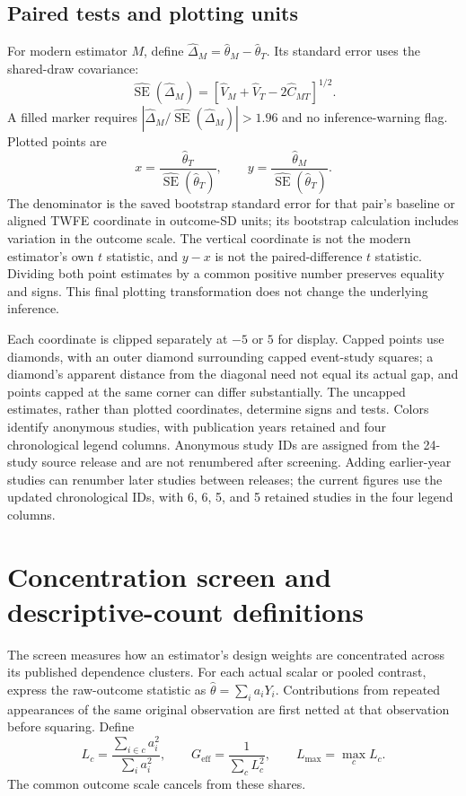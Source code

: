 \documentclass[11pt,letterpaper]{article}
\newcommand{\SE}{\operatorname{SE}}
\begin{document}
\subsection{Paired tests and plotting units}
For modern estimator $M$, define $\hat\Delta_M=\hat\theta_M-\hat\theta_T$. Its standard error uses the shared-draw covariance:
\begin{equation}
\widehat{\SE}(\hat\Delta_M)=
\left[\widehat V_M+\widehat V_T-2\widehat C_{MT}\right]^{1/2}.
\end{equation}
A filled marker requires $|\hat\Delta_M/\widehat{\SE}(\hat\Delta_M)|>1.96$ and no inference-warning flag. Plotted points are
\begin{equation}
x=\frac{\hat\theta_T}{\widehat{\SE}(\hat\theta_T)},\qquad
y=\frac{\hat\theta_M}{\widehat{\SE}(\hat\theta_T)}.
\end{equation}
The denominator is the saved bootstrap standard error for that pair's baseline or aligned TWFE coordinate in outcome-SD units; its bootstrap calculation includes variation in the outcome scale. The vertical coordinate is not the modern estimator's own $t$ statistic, and $y-x$ is not the paired-difference $t$ statistic. Dividing both point estimates by a common positive number preserves equality and signs. This final plotting transformation does not change the underlying inference.

Each coordinate is clipped separately at $-5$ or $5$ for display. Capped points use diamonds, with an outer diamond surrounding capped event-study squares; a diamond's apparent distance from the diagonal need not equal its actual gap, and points capped at the same corner can differ substantially. The uncapped estimates, rather than plotted coordinates, determine signs and tests. Colors identify anonymous studies, with publication years retained and four chronological legend columns. Anonymous study IDs are assigned from the 24-study source release and are not renumbered after screening. Adding earlier-year studies can renumber later studies between releases; the current figures use the updated chronological IDs, with 6, 6, 5, and 5 retained studies in the four legend columns.

\section{Concentration screen and descriptive-count definitions}
\label{app:screen}

The screen measures how an estimator's design weights are concentrated across its published dependence clusters. For each actual scalar or pooled contrast, express the raw-outcome statistic as $\hat\theta=\sum_i a_iY_i$. Contributions from repeated appearances of the same original observation are first netted at that observation before squaring. Define
\begin{equation}
L_c=\frac{\sum_{i\in c}a_i^2}{\sum_i a_i^2},\qquad
G_{\mathrm{eff}}=\frac{1}{\sum_c L_c^2},\qquad
L_{\max}=\max_c L_c.
\end{equation}
The common outcome scale cancels from these shares. 
\end{document}
